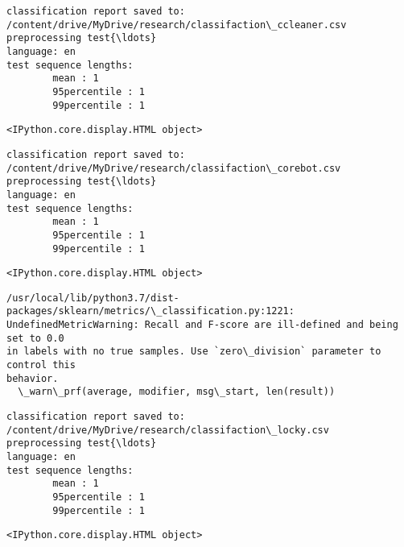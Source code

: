 \documentclass[11pt]{article}
\begin{document}
    
    \begin{Verbatim}[commandchars=\\\{\}]
classification report saved to:
/content/drive/MyDrive/research/classifaction\_ccleaner.csv
preprocessing test{\ldots}
language: en
test sequence lengths:
        mean : 1
        95percentile : 1
        99percentile : 1
    \end{Verbatim}

    
    \begin{Verbatim}[commandchars=\\\{\}]
<IPython.core.display.HTML object>
    \end{Verbatim}

    
    \begin{Verbatim}[commandchars=\\\{\}]
classification report saved to:
/content/drive/MyDrive/research/classifaction\_corebot.csv
preprocessing test{\ldots}
language: en
test sequence lengths:
        mean : 1
        95percentile : 1
        99percentile : 1
    \end{Verbatim}

    
    \begin{Verbatim}[commandchars=\\\{\}]
<IPython.core.display.HTML object>
    \end{Verbatim}

    
    \begin{Verbatim}[commandchars=\\\{\}]
/usr/local/lib/python3.7/dist-packages/sklearn/metrics/\_classification.py:1221:
UndefinedMetricWarning: Recall and F-score are ill-defined and being set to 0.0
in labels with no true samples. Use `zero\_division` parameter to control this
behavior.
  \_warn\_prf(average, modifier, msg\_start, len(result))
    \end{Verbatim}

    \begin{Verbatim}[commandchars=\\\{\}]
classification report saved to:
/content/drive/MyDrive/research/classifaction\_locky.csv
preprocessing test{\ldots}
language: en
test sequence lengths:
        mean : 1
        95percentile : 1
        99percentile : 1
    \end{Verbatim}

    
    \begin{Verbatim}[commandchars=\\\{\}]
<IPython.core.display.HTML object>
    \end{Verbatim}
\end{document}
